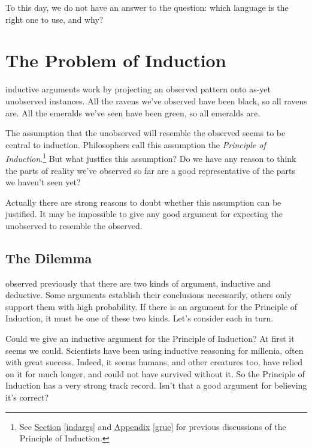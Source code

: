 \documentclass[justified]{tufte-book}
\theoremstyle{definition}
\theoremstyle{definition}
\theoremstyle{definition}
\theoremstyle{remark}
\begin{document}
To this day, we do not have an answer to the question: which language is the right one to use, and why?

\hypertarget{the-problem-of-induction}{%
\chapter{The Problem of Induction}\label{the-problem-of-induction}}

 inductive arguments work by projecting an observed pattern onto as-yet unobserved instances. All the ravens we've observed have been black, so all ravens are. All the emeralds we've seen have been green, so all emeralds are.

The assumption that the unobserved will resemble the observed seems to be central to induction. Philosophers call this assumption the \emph{Principle of Induction}.\footnote{See \protect\hyperlink{indargs}{Section} \ref{indargs} and \protect\hyperlink{grue}{Appendix} \ref{grue} for previous discussions of the Principle of Induction.} But what justfies this assumption? Do we have any reason to think the parts of reality we've observed so far are a good representative of the parts we haven't seen yet?

Actually there are strong reasons to doubt whether this assumption can be justified. It may be impossible to give any good argument for expecting the unobserved to resemble the observed.

\hypertarget{the-dilemma}{%
\section*{The Dilemma}\label{the-dilemma}}

 observed previously that there are two kinds of argument, inductive and deductive. Some arguments establish their conclusions necessarily, others only support them with high probability. If there is an argument for the Principle of Induction, it must be one of these two kinds. Let's consider each in turn.

Could we give an inductive argument for the Principle of Induction? At first it seems we could. Scientists have been using inductive reasoning for millenia, often with great success. Indeed, it seems humans, and other creatures too, have relied on it for much longer, and could not have survived without it. So the Principle of Induction has a very strong track record. Isn't that a good argument for believing it's correct?
\end{document}
